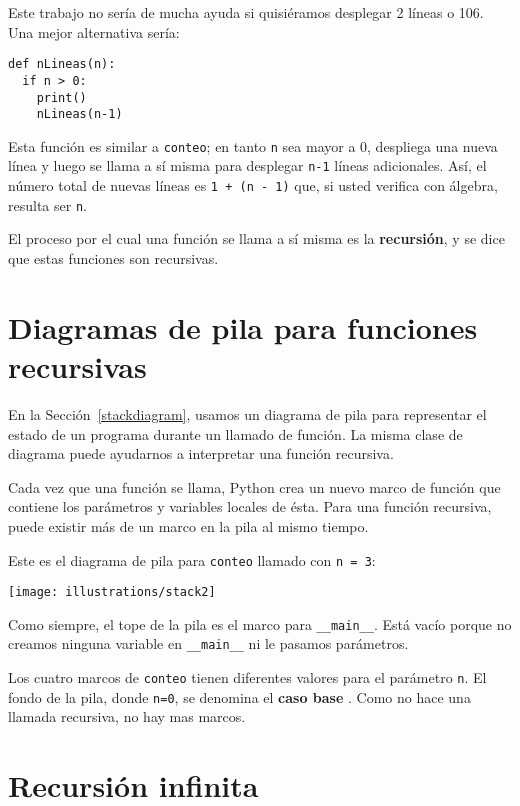 Este trabajo no sería de mucha ayuda si quisiéramos desplegar 2 líneas
o 106. Una mejor alternativa sería:

\begin{lstlisting}
def nLineas(n):
  if n > 0:
    print()
    nLineas(n-1)
\end{lstlisting}
 Esta función es similar a \texttt{conteo}; en tanto \texttt{n} sea
mayor a 0, despliega una nueva línea y luego se llama a sí misma para
desplegar \texttt{n-1} líneas adicionales. Así, el número total de
nuevas líneas es \texttt{1 + (n - 1)} que, si usted verifica con álgebra,
resulta ser \texttt{n}.

El proceso por el cual una función se llama a sí misma es la \textbf{recursión},
y se dice que estas funciones son recursivas.

 

\section{Diagramas de pila para funciones recursivas}

  

En la Sección~\ref{stackdiagram}, usamos un diagrama de pila para
representar el estado de un programa durante un llamado de función.
La misma clase de diagrama puede ayudarnos a interpretar una función
recursiva.

Cada vez que una función se llama, Python crea un nuevo marco de función
que contiene los parámetros y variables locales de ésta. Para una
función recursiva, puede existir más de un marco en la pila al mismo
tiempo.

Este es el diagrama de pila para \texttt{conteo} llamado con \texttt{n
= 3}:

\beforefig \centerline{\texttt{[image: illustrations/stack2]}}
\afterfig

Como siempre, el tope de la pila es el marco para \texttt{\_\_main\_\_}.
Está vacío porque no creamos ninguna variable en \texttt{\_\_main\_\_}
ni le pasamos parámetros.

Los cuatro marcos de \texttt{conteo} tienen diferentes valores para
el parámetro \texttt{n}. El fondo de la pila, donde \texttt{n=0},
se denomina el \textbf{caso base }. Como no hace una llamada recursiva,
no hay mas marcos.

 

\section{Recursión infinita}

